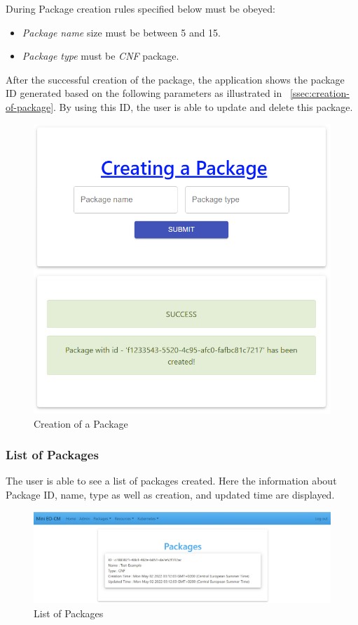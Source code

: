 During Package creation rules specified below must be obeyed:
\begin{itemize}
  \item \emph{Package name} size must be between 5 and 15.
  \item \emph{Package type} must be \emph{CNF} package.
\end{itemize}

After the successful creation of the package, the application shows the package ID generated based on the following parameters as illustrated in ~\autoref{ssec:creation-of-package}. By using this ID, the user is able to update and delete this package.

\begin{figure}[H]
	\centering
	\includegraphics[width=\textwidth]{images/create-package-2.png}
	\caption{Creation of a Package}
	\label{ssec:creation-of-package}
\end{figure}

\subsubsection{List of Packages}
The user is able to see a list of packages created. Here the information about Package ID, name, type as well as creation, and updated time are displayed.

\begin{figure}[H]
	\centering
	\includegraphics[width=\textwidth]{images/get-packages-4.png}
	\caption{List of Packages}
\end{figure}

